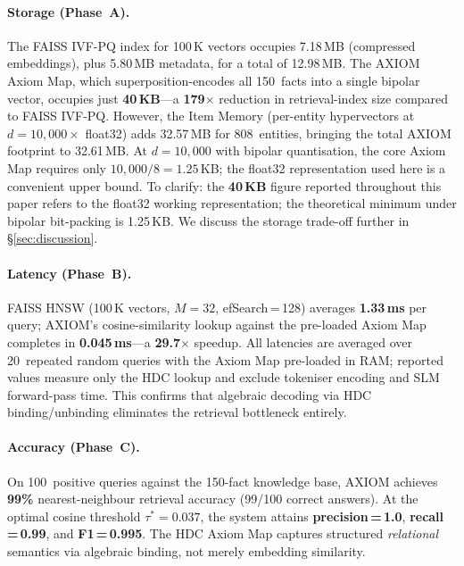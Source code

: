 \documentclass[11pt,a4paper]{article}
\begin{document}
\paragraph{Storage (Phase~A).}
The FAISS IVF-PQ index for 100\,K vectors occupies 7.18\,MB (compressed
embeddings), plus 5.80\,MB metadata, for a total of 12.98\,MB.
The AXIOM Axiom Map, which superposition-encodes all 150~facts into a
single bipolar vector, occupies just \textbf{40\,KB}---a
\textbf{179$\times$} reduction in retrieval-index size compared to
FAISS IVF-PQ.  However, the Item Memory (per-entity hypervectors at
$d = 10{,}000 \times$ float32) adds 32.57\,MB for 808~entities, bringing
the total AXIOM footprint to 32.61\,MB.  At $d = 10{,}000$ with bipolar
quantisation, the core Axiom Map requires only $10{,}000 / 8 = 1.25$\,KB;
the float32 representation used here is a convenient upper bound.
To clarify: the \textbf{40\,KB} figure reported throughout this paper
refers to the float32 working representation; the theoretical minimum
under bipolar bit-packing is 1.25\,KB.
We discuss the storage trade-off further in \S\ref{sec:discussion}.

\paragraph{Latency (Phase~B).}
FAISS HNSW (100\,K vectors, $M\!=\!32$, efSearch\,=\,128) averages
\textbf{1.33\,ms} per query; AXIOM's cosine-similarity lookup against
the pre-loaded Axiom Map completes in \textbf{0.045\,ms}---a
\textbf{29.7$\times$} speedup.
All latencies are averaged over 20~repeated random queries with the
Axiom Map pre-loaded in RAM; reported values measure only the HDC
lookup and exclude tokeniser encoding and SLM forward-pass time.
This confirms that algebraic decoding
via HDC binding/unbinding eliminates the retrieval bottleneck entirely.

\paragraph{Accuracy (Phase~C).}
On 100~positive queries against the 150-fact knowledge base, AXIOM
achieves \textbf{99\%} nearest-neighbour retrieval accuracy (99/100
correct answers).  At the optimal cosine threshold
$\tau^{*}\!=\!0.037$, the system attains \textbf{precision\,=\,1.0},
\textbf{recall\,=\,0.99}, and \textbf{F1\,=\,0.995}.
The HDC Axiom Map captures structured \emph{relational} semantics
via algebraic binding, not merely embedding similarity.
\end{document}
